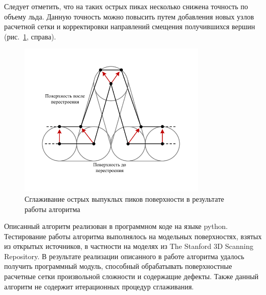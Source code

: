 Следует отметить, что на таких острых пиках несколько снижена точность по объему льда.
Данную точность можно повысить путем добавления новых узлов расчетной сетки и корректировки направлений смещения получившихся вершин (рис.~\ref{fig:text_1_remesh_common_envelope_6}, справа).

\begin{figure}[ht]
	\centering
		\includegraphics[width=0.80\textwidth]{./pics/text_1_remesh_common_envelope/peak2.pdf}
	\caption{Сглаживание острых выпуклых пиков поверхности в результате работы алгоритма}
	\label{fig:text_1_remesh_common_envelope_6}
\end{figure}

Описанный алгоритм реализован в программном коде на языке python.
Тестирование работы алгоритма выполнялось на модельных поверхностях, взятых из открытых источников, в частности на моделях из The Stanford 3D Scanning Repository.
В результате реализации описанного в работе алгоритма удалось получить программный модуль, способный обрабатывать поверхностные расчетные сетки произвольной сложности и содержащие дефекты.
Также данный алгоритм не содержит итерационных процедур сглаживания.

